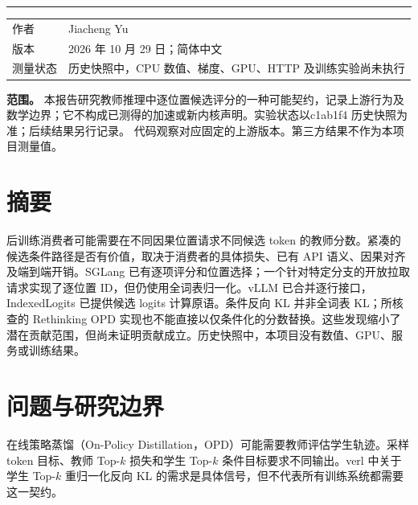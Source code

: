\documentclass[11pt,a4paper]{article}
\begin{document}
\hypersetup{pageanchor=false}
\begin{titlepage}
\vspace*{11mm}{\small\sffamily\bfseries AI 基础设施 / 技术报告}\par
\vspace{14mm}{\LARGE\bfseries 候选集条件\\[2mm]教师评分\par}
\vspace{6mm}{\large 系统背景、概率契约、已有工作与评估设计\par}
\vspace{9mm}\hrule\vspace{7mm}
\begin{tabularx}{\linewidth}{@{}p{40mm}Y@{}}
作者 & Jiacheng Yu\\
版本 & 2026 年 10 月 29 日；简体中文\\
测量状态 & 历史快照中，CPU 数值、梯度、GPU、HTTP 及训练实验尚未执行\\
\end{tabularx}
\par\vspace{10mm}\noindent\textbf{范围。} 本报告研究教师推理中逐位置候选评分的一种可能契约，记录上游行为及数学边界；它不构成已测得的加速或新内核声明。实验状态以c1ab1f4 历史快照为准；后续结果另行记录。
\vfill{\small 代码观察对应固定的上游版本。第三方结果不作为本项目测量值。}
\end{titlepage}
\hypersetup{pageanchor=true}
\section*{摘要}
后训练消费者可能需要在不同因果位置请求不同候选 token 的教师分数。紧凑的候选条件路径是否有价值，取决于消费者的具体损失、已有 API 语义、因果对齐及端到端开销。SGLang 已有逐项评分和位置选择；一个针对特定分支的开放拉取请求实现了逐位置 ID，但仍使用全词表归一化。vLLM 已合并逐行接口，IndexedLogits 已提供候选 logits 计算原语。条件反向 KL 并非全词表 KL；所核查的 Rethinking OPD 实现也不能直接以仅条件化的分数替换。这些发现缩小了潜在贡献范围，但尚未证明贡献成立。历史快照中，本项目没有数值、GPU、服务或训练结果。
\tableofcontents\clearpage
\section{问题与研究边界}
在线策略蒸馏（On-Policy Distillation，OPD）可能需要教师评估学生轨迹。采样 token 目标、教师 Top-$k$ 损失和学生 Top-$k$ 条件目标要求不同输出。verl 中关于学生 Top-$k$ 重归一化反向 KL 的需求是具体信号，但不代表所有训练系统都需要这一契约。\cite{verl6676,verlteacher,verlloss}
\end{document}
